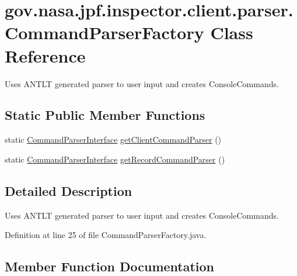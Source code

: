 \hypertarget{classgov_1_1nasa_1_1jpf_1_1inspector_1_1client_1_1parser_1_1_command_parser_factory}{}\section{gov.\+nasa.\+jpf.\+inspector.\+client.\+parser.\+Command\+Parser\+Factory Class Reference}
\label{classgov_1_1nasa_1_1jpf_1_1inspector_1_1client_1_1parser_1_1_command_parser_factory}


Uses A\+N\+T\+LT generated parser to user input and creates Console\+Commands.  


\subsection*{Static Public Member Functions}
\begin{DoxyCompactItemize}
\item 
static \hyperlink{interfacegov_1_1nasa_1_1jpf_1_1inspector_1_1client_1_1parser_1_1_command_parser_interface}{Command\+Parser\+Interface} \hyperlink{classgov_1_1nasa_1_1jpf_1_1inspector_1_1client_1_1parser_1_1_command_parser_factory_a323b35e24a71d5ef06e290ca11df2e5c}{get\+Client\+Command\+Parser} ()
\item 
static \hyperlink{interfacegov_1_1nasa_1_1jpf_1_1inspector_1_1client_1_1parser_1_1_command_parser_interface}{Command\+Parser\+Interface} \hyperlink{classgov_1_1nasa_1_1jpf_1_1inspector_1_1client_1_1parser_1_1_command_parser_factory_aa1df4872c92e061409180052e42f4622}{get\+Record\+Command\+Parser} ()
\end{DoxyCompactItemize}


\subsection{Detailed Description}
Uses A\+N\+T\+LT generated parser to user input and creates Console\+Commands. 

Definition at line 25 of file Command\+Parser\+Factory.\+java.



\subsection{Member Function Documentation}
